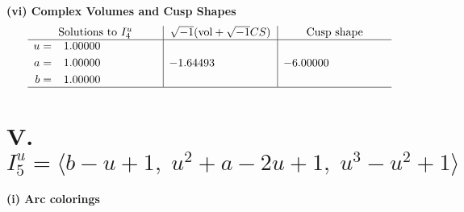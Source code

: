 \documentclass[1p]{elsarticle_modified}
\theoremstyle{definition}
\newcommand{\I}{\sqrt{-1}}
\begin{document}
\newpage\flushleft \textbf{(vi) Complex Volumes and Cusp Shapes}
$$\begin{array}{c|c|c}  
\text{Solutions to }I^u_{4}& \I (\text{vol} + \sqrt{-1}CS) & \text{Cusp shape}\\
 \hline 
\begin{aligned}
u &= \phantom{-}1.00000\phantom{ +0.000000I} \\
a &= \phantom{-}1.00000\phantom{ +0.000000I} \\
b &= \phantom{-}1.00000\phantom{ +0.000000I}\end{aligned}
 & -1.64493\phantom{ +0.000000I} & -6.00000\phantom{ +0.000000I}\\
 \hline 
 \end{array}$$\newpage\newpage\renewcommand{\arraystretch}{1}
\centering \section*{V. $I^u_{5}= \langle b- u+1,\;u^2+a-2 u+1,\;u^3- u^2+1 \rangle$}
\flushleft \textbf{(i) Arc colorings}\\
\end{document}
